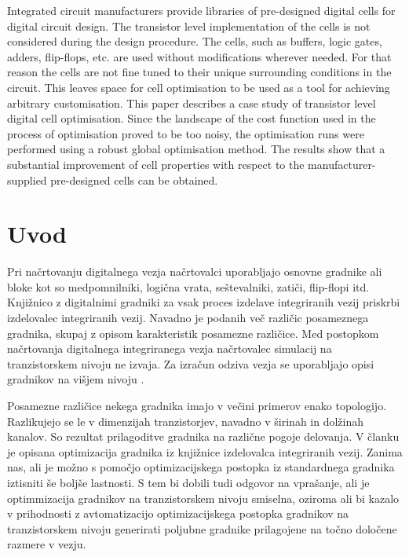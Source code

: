\documentclass[journal,a4paper,twoside]{sty/IEEEtran}
\begin{document}
{Integrated circuit manufacturers provide libraries of pre-designed digital cells for digital circuit design. The transistor level implementation of the cells is not considered during the design procedure. The cells, such as buffers, logic gates, adders, flip-flops, etc. are used without modifications wherever needed. For that reason the cells are not fine tuned to their unique surrounding conditions in the circuit. This leaves space for cell optimisation to be used as a tool for achieving arbitrary customisation. This paper describes a case study of transistor level digital cell optimisation. Since the landscape of the cost function used in the process of optimisation proved to be too noisy, the optimisation runs were performed using a robust global optimisation method. The results show that a substantial improvement of cell properties with respect to the manufacturer-supplied pre-designed cells can be obtained.}

\section{Uvod}

Pri načrtovanju digitalnega vezja načrtovalci uporabljajo osnovne gradnike ali bloke \cite{kaeslin} kot so medpomnilniki, logična vrata, seštevalniki, zatiči, flip-flopi itd. Knjižnico z digitalnimi gradniki za vsak proces izdelave integriranih vezij priskrbi izdelovalec integriranih vezij. Navadno je podanih več različic posameznega gradnika, skupaj z opisom karakteristik posamezne različice. Med postopkom načrtovanja digitalnega integriranega vezja načrtovalec simulacij \cite{hspice, kunderth, virtuoso, tuma} na tranzistorskem nivoju ne izvaja. Za izračun odziva vezja se uporabljajo opisi gradnikov na višjem nivoju \cite{thomas, pedroni}.

Posamezne različice nekega gradnika imajo v večini primerov enako topologijo. Razlikujejo se le v dimenzijah tranzistorjev, navadno v širinah in dolžinah kanalov. So rezultat prilagoditve gradnika na različne pogoje delovanja. V članku je opisana optimizacija gradnika iz knjižnice izdelovalca integriranih vezij. Zanima nas, ali je možno s pomočjo optimizacijskega postopka iz standardnega gradnika iztisniti še boljše lastnosti. S tem bi dobili tudi odgovor na vprašanje, ali je optimmizacija gradnikov na tranzistorskem nivoju smiselna, oziroma ali bi kazalo v prihodnosti z avtomatizacijo optimizacijskega postopka gradnikov na tranzistorskem nivoju generirati poljubne gradnike prilagojene na točno določene razmere v vezju.
\end{document}
